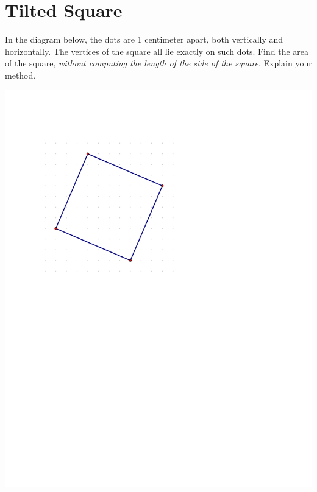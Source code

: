\newpage

\section{Tilted Square}

\begin{prob}
In the diagram below, the dots are 1 centimeter apart, both vertically and horizontally.  The vertices of the square all lie exactly on such dots. Find the area of the square, \emph{without computing the length of the side of the square}.  Explain your method.  

\includegraphics{../graphics/tiltedSquare}

\end{prob}
